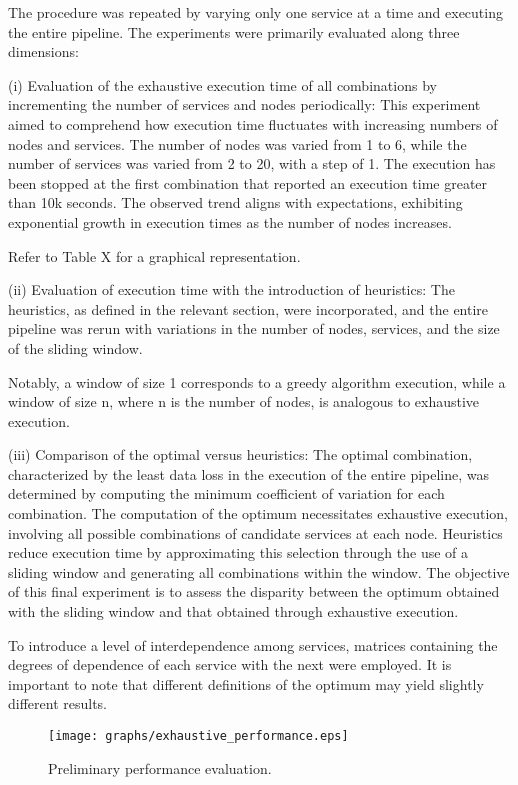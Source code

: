 The procedure was repeated by varying only one service at a time and executing the entire pipeline.
The experiments were primarily evaluated along three dimensions:

(i) Evaluation of the exhaustive execution time of all combinations by incrementing the number of services and nodes periodically:
This experiment aimed to comprehend how execution time fluctuates with increasing numbers of nodes and services.
The number of nodes was varied from 1 to 6, while the number of services was varied from 2 to 20, with a step of 1.
The execution has been stopped at the first combination that reported an execution time greater than 10k seconds.
The observed trend aligns with expectations, exhibiting exponential growth in execution times as the number of nodes increases.

Refer to Table X for a graphical representation.

(ii) Evaluation of execution time with the introduction of heuristics:
The heuristics, as defined in the relevant section, were incorporated,
and the entire pipeline was rerun with variations in the number of nodes,
services, and the size of the sliding window.

Notably, a window of size 1 corresponds to a greedy algorithm execution,
while a window of size n, where n is the number of nodes, is analogous to exhaustive execution.

(iii) Comparison of the optimal versus heuristics:
The optimal combination, characterized by the least data loss in the execution of the entire pipeline,
was determined by computing the minimum coefficient of variation for each combination.
The computation of the optimum necessitates exhaustive execution, involving all possible combinations of candidate services at each node.
Heuristics reduce execution time by approximating this selection through the use of a sliding window and generating all combinations within the window.
The objective of this final experiment is to assess the disparity between the optimum obtained with the sliding window and that obtained through exhaustive execution.

To introduce a level of interdependence among services,
matrices containing the degrees of dependence of each service with the next were employed.
It is important to note that different definitions of the optimum may yield slightly different results.

\begin{figure}
  \texttt{[image: graphs/exhaustive\_performance.eps]}
  \caption{Preliminary performance evaluation.}
  \label{fig:perf}
\end{figure}



